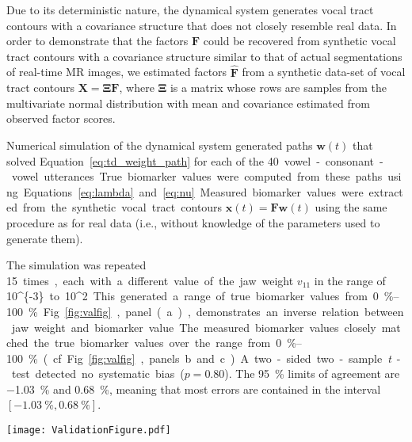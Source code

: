 \documentclass[reprint]{JASAnew}\usepackage[]{graphicx}\usepackage[]{color}
\begin{document}
Due to its deterministic nature, the dynamical system generates vocal tract contours with a covariance structure that does not closely resemble real data. In order to demonstrate that the factors $\mathbf{F}$ could be recovered from synthetic vocal tract contours with a covariance structure similar to that of actual segmentations of real-time MR images, we estimated factors $\mathbf{\hat{F}}$ from a synthetic data-set of vocal tract contours $\mathbf{X} = \boldsymbol{\Xi}\mathbf{F}$, where $\boldsymbol{\Xi}$ is a matrix whose rows are samples from the multivariate normal distribution with mean and covariance estimated from observed factor scores. 

Numerical simulation of the dynamical system generated paths $\mathbf{w}(t)$ that solved Equation~\ref{eq:td_weight_path} for each of the \SI{40} vowel-consonant-vowel utterances. True biomarker values were computed from these paths using Equations~\ref{eq:lambda} and~\ref{eq:nu}. Measured biomarker values were extracted from the synthetic vocal tract contours $\mathbf{x}(t) = \mathbf{F}\mathbf{w}(t)$ using the same procedure as for real data (i.e., without knowledge of the parameters used to generate them). 

The simulation was repeated \SI{15} times, each with a different value of the jaw weight $v_{11}$ in the range of \SI[parse-numbers=false]{10^{-3}} to \SI[parse-numbers=false]{10^2}. This generated a range of true biomarker values from \SIrange{0}{100}{\percent}. Fig.~\ref{fig:valfig}, panel (a), demonstrates an inverse relation between jaw weight and biomarker value. The measured biomarker values closely matched the true biomarker values over the range from~\SIrange{0}{100}{\percent} (cf. Fig.~\ref{fig:valfig}, panels b and c). A two-sided two-sample {\it t}-test detected no systematic bias ($p = 0.80$). The \SI{95}{\percent} limits of agreement are \SI{-1.03}{\percent} and \SI{0.68}{\percent}, meaning that most errors are contained in the interval $[\SI{-1.03}{\percent},\SI{0.68}{\percent}]$.

\begin{figure*}
\centering
\texttt{[image: ValidationFigure.pdf]}
\caption{{\bf a.} Relationship between measured biomarker values and theoretical jaw weight parameter values. The jaw weight parameter controls jaw usage in the dynamical systems simulation of vocal tract movement. Large biomarker values close to \SI{100}{\percent} correspond to small jaw weight parameters (indicating great jaw usage). Small biomarker values close to \SI{0}{\percent} correspond to large jaw weight parameters (indicating little jaw usage).
{\bf b.} Relationship between the true and measured biomarker values. True values were obtained from synthetic data generated in a dynamical systems simulation.
{\bf c.} Bland-Altman diagram of \SI{95}{\percent} of the measured biomarker values differed from the true value by \SIrange{-1.03}{0.68}{\percent}. Measurement bias (\SI{-0.25}{\percent}) was not significantly different from zero.}
\label{fig:valfig}
\end{figure*}
\end{document}
